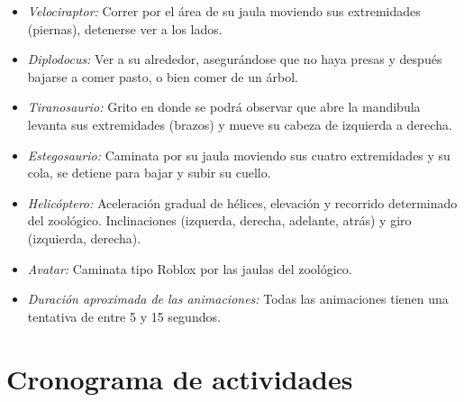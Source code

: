 \documentclass[12pt]{article} %
\begin{document}
	\begin{itemize}
		\item[\textbullet] \emph{Velociraptor:} Correr por el área de su jaula moviendo sus extremidades (piernas), detenerse ver a los lados.
		\item[\textbullet] \emph{Diplodocus:} Ver a su alrededor, asegurándose que no haya presas y después bajarse a comer pasto, 
					o bien comer de un árbol.
		\item[\textbullet] \emph{Tiranosaurio:} Grito en donde se podrá observar que abre la mandibula levanta sus extremidades (brazos) y mueve su cabeza de izquierda a derecha.
		\item[\textbullet] \emph{Estegosaurio:} Caminata por su jaula moviendo sus cuatro extremidades y su cola, se detiene para bajar y subir su cuello.
		\item[\textbullet] \emph{Helicóptero:} Aceleración gradual de hélices, elevación y recorrido determinado del zoológico. 
				Inclinaciones (izquerda, derecha, adelante, atrás) y giro (izquierda, derecha).
		\item[\textbullet] \emph{Avatar:} Caminata tipo Roblox por las jaulas del zoológico.
		\item[\textbullet] \emph{Duración aproximada de las animaciones:} Todas las animaciones tienen una tentativa de entre 5 y 15 segundos.
 	\end{itemize}
 	
 	\section{Cronograma de actividades}
 	
\end{document}
